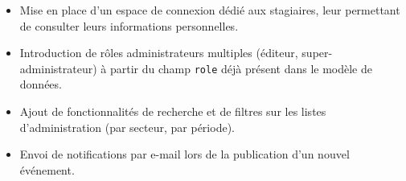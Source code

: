 \documentclass[11pt,a4paper]{report}
\begin{document}
\begin{itemize}[leftmargin=1.2em]
    \item Mise en place d'un espace de connexion dédié aux stagiaires,
    leur permettant de consulter leurs informations personnelles.
    \item Introduction de rôles administrateurs multiples (éditeur,
    super-administrateur) à partir du champ \texttt{role} déjà présent dans
    le modèle de données.
    \item Ajout de fonctionnalités de recherche et de filtres sur les listes
    d'administration (par secteur, par période).
    \item Envoi de notifications par e-mail lors de la publication d'un
    nouvel événement.
\end{itemize}
\end{document}
